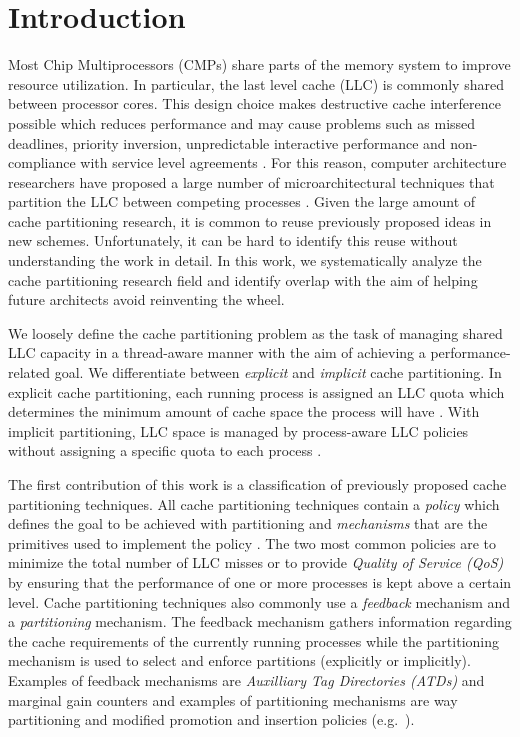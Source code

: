 \section{Introduction}

Most Chip Multiprocessors (CMPs) share parts of the memory system to improve resource utilization.
In particular, the last level cache (LLC) is commonly shared between processor cores.
This design choice makes destructive cache interference possible which reduces performance and may cause problems such as missed deadlines, priority inversion, unpredictable interactive performance and non-compliance with service level agreements \cite{dubois13}.
For this reason, computer architecture researchers have proposed a large number of microarchitectural techniques that partition the LLC between competing processes .
Given the large amount of cache partitioning research, it is common to reuse previously proposed ideas in new schemes.
Unfortunately, it can be hard to identify this reuse without understanding the work in detail.
In this work, we systematically analyze the cache partitioning research field and identify overlap with the aim of helping future architects avoid reinventing the wheel.

We loosely define the cache partitioning problem as the task of managing shared LLC capacity in a thread-aware manner with the aim of achieving a performance-related goal.
We differentiate between \textit{explicit} and \textit{implicit} cache partitioning.
In explicit cache partitioning, each running process is assigned an LLC quota which determines the minimum amount of cache space the process will have .
With implicit partitioning, LLC space is managed by process-aware LLC policies without assigning a specific quota to each process .

The first contribution of this work is a classification of previously proposed cache partitioning techniques.
All cache partitioning techniques contain a \textit{policy} which defines the goal to be achieved with partitioning and \textit{mechanisms} that are the primitives used to implement the policy \cite{virtualPrivateMachines}.
The two most common policies are to minimize the total number of LLC misses or to provide \textit{Quality of Service (QoS)} by ensuring that the performance of one or more processes is kept above a certain level.
Cache partitioning techniques also commonly use a \textit{feedback} mechanism and a \textit{partitioning} mechanism.
The feedback mechanism gathers information regarding the cache requirements of the currently running processes while the partitioning mechanism is used to select and enforce partitions (explicitly or implicitly).
Examples of feedback mechanisms are \textit{Auxilliary Tag Directories (ATDs)} \cite{utilityBasedCachePartitioning,haakonHiPC} and marginal gain counters \cite{dynPartofSharedCacheMemory,suh02} and examples of partitioning mechanisms are way partitioning  \cite{utilityBasedCachePartitioning} and modified promotion and insertion policies (e.g.\ \cite{xie09}).

